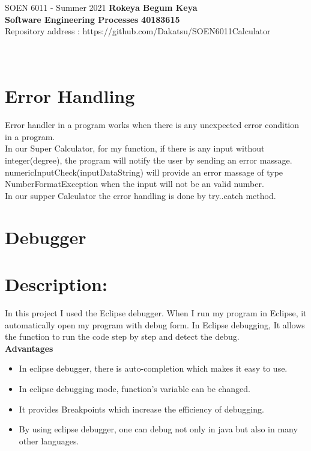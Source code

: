 \documentclass[letterpaper, 11pt]{report}
\begin{document}
\section*{}
\normalsize {SOEN 6011 - Summer 2021} \hfill \textbf{Rokeya Begum Keya} \\
\textbf{ Software Engineering Processes}  \hfill \textbf{40183615} \\
\hfill Repository address : https://github.com/Dakatsu/SOEN6011Calculator
\\\\\\
\section*{Error Handling}
Error handler in a program works when there is any unexpected error condition in a program.
\newline \\
In our Super Calculator, for my function, if there is any input without integer(degree), the program will notify the user by sending an error massage. 
\newline\\
numericInputCheck(inputDataString)  will provide an error massage of type NumberFormatException when the input will not be an valid number.
\newline\\
In our supper Calculator the error handling is done by try..catch method.

\section*{Debugger}
   \section*{Description:}
In this project I used the Eclipse debugger. When I run my program in Eclipse, it automatically open my program with debug form. In Eclipse debugging, It allows the function to run the code step by step and detect the debug.  \\

\textbf{Advantages}
\begin{itemize}
\item In eclipse debugger, there is auto-completion which makes it easy to use.
\item In eclipse debugging mode, function's variable can be changed.
\item It provides Breakpoints which increase the efficiency of debugging.  
\item By using eclipse debugger, one can debug not only in java but also in many other languages.
\end{itemize}
\end{document}
